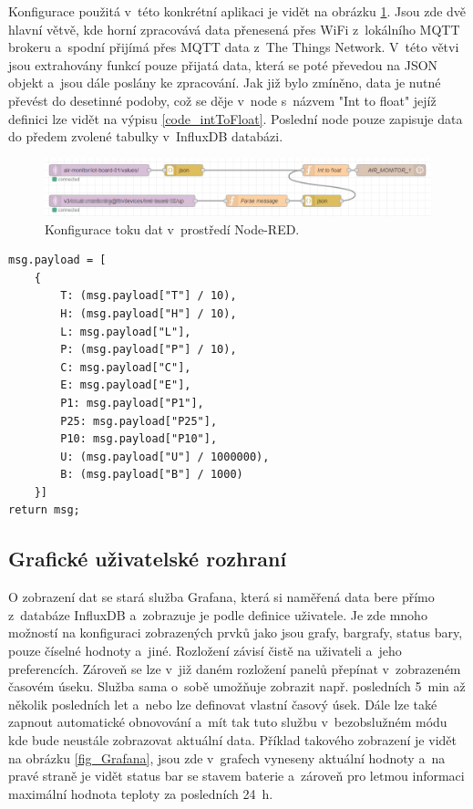 Konfigurace použitá v~této konkrétní aplikaci je vidět na obrázku \ref{fig_NodeRED}. Jsou zde dvě hlavní větvě, kde horní zpracovává data přenesená přes WiFi z~lokálního MQTT brokeru a~spodní přijímá přes MQTT data z~The Things Network. V~této větvi jsou extrahovány funkcí pouze přijatá data, která se poté převedou na JSON objekt a~jsou dále poslány ke zpracování. Jak již bylo zmíněno, data je nutné převést do desetinné podoby, což se děje v~node s~názvem "Int to float" jejíž definici lze vidět na výpisu \ref{code_intToFloat}. Poslední node pouze zapisuje data do předem zvolené tabulky v~InfluxDB databázi.

\begin{figure}[h]
    \centering
    \includegraphics[width=\textwidth]{obrazky/nodered.png}
    \caption{Konfigurace toku dat v~prostředí Node-RED.}
    \label{fig_NodeRED}
\end{figure}

\noindent
\begin{minipage}{\linewidth}
\begin{lstlisting}[caption={Funkce pro převod naměřených dat do desetinné podoby.}, label={code_intToFloat}]
msg.payload = [
    {
        T: (msg.payload["T"] / 10),
        H: (msg.payload["H"] / 10),
        L: msg.payload["L"],
        P: (msg.payload["P"] / 10),
        C: msg.payload["C"],
        E: msg.payload["E"],
        P1: msg.payload["P1"],
        P25: msg.payload["P25"],
        P10: msg.payload["P10"],
        U: (msg.payload["U"] / 1000000),
        B: (msg.payload["B"] / 1000)
    }]
return msg;
\end{lstlisting}
\end{minipage}

\subsection{Grafické uživatelské rozhraní}

O zobrazení dat se stará služba Grafana, která si naměřená data bere přímo z~databáze InfluxDB a~zobrazuje je podle definice uživatele. Je zde mnoho možností na konfiguraci zobrazených prvků jako jsou grafy, bargrafy, status bary, pouze číselné hodnoty a~jiné. Rozložení závisí čistě na uživateli a~jeho preferencích. Zároveň se lze v~již daném rozložení panelů přepínat v~zobrazeném časovém úseku. Služba sama o~sobě umožňuje zobrazit např. posledních \SI{5}{\minute} až několik posledních let a~nebo lze definovat vlastní časový úsek. Dále lze také zapnout automatické obnovování a~mít tak tuto službu v~bezobslužném módu kde bude neustále zobrazovat aktuální data. Příklad takového zobrazení je vidět na obrázku \ref{fig_Grafana}, jsou zde v~grafech vyneseny aktuální hodnoty a~na pravé straně je vidět status bar se stavem baterie a~zároveň pro letmou informaci maximální hodnota teploty za posledních \SI{24}{\hour}.

